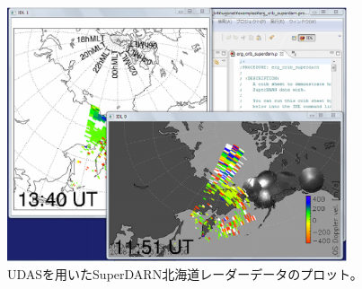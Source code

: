 \documentclass[a4j]{jbook}
\begin{document}
\begin{figure}[H]
\begin{center}
\includegraphics[width=10cm]{images/screenshot_erg_crib_superdarn.eps}
\caption{UDASを用いたSuperDARN北海道レーダーデータのプロット。}
\label{superdarn}
\end{center}
\end{figure}
\end{document}
